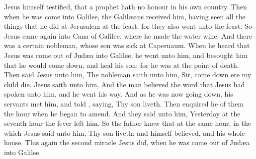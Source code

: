 {Jesus
himself
testified,
that a
prophet
hath
no
honour
in his
own
country.
Then
when he was
come
into
Galilee, the
Galilæans
received
him, having
seen all the
things
that he
did
at
Jerusalem
at the
feast:
for
they
also
went
unto the
feast.
So
Jesus
came
again
into
Cana of
Galilee,
where he
made the
water
wine.
And there
was a
certain
nobleman,
whose
son was
sick
at
Capernaum.
When
he
heard
that
Jesus was
come out
of
Judæa
into
Galilee, he
went
unto
him,
and
besought
him
that he would come
down,
and
heal
his
son:
for he was at the point
of
death.
Then
said
Jesus
unto
him,
{}
The
nobleman
saith
unto
him,
Sir, come
down
ere
my
child
die.
Jesus
saith unto
him,
{}
And the
man
believed the
word
that
Jesus had
spoken unto
him,
and he went his
way.
And
as
he
was
now going
down,
his
servants
met
him,
and
told
{},
saying,
Thy
son
liveth.
Then enquired
he
of
them the
hour
when he
began to
amend.
And they
said unto
him,
Yesterday at
the
seventh
hour the
fever
left
him.
So the
father
knew
that
{}
at the
same
hour,
in the
which
Jesus
said unto
him,
Thy
son
liveth:
and
himself
believed,
and
his
whole
house.
This
{}
again
the
second
miracle
{}
Jesus
did, when he was
come out
of
Judæa
into
Galilee.

}
